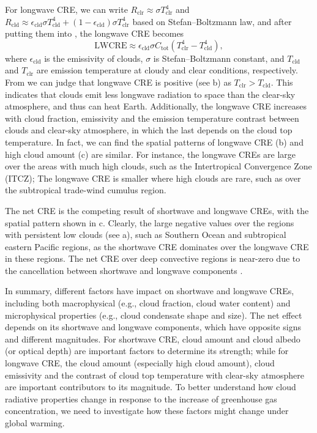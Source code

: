 For longwave CRE, we can write $R_{\mathrm{clr}}\approx \sigma T_{\mathrm{clr}}^4$ and $R_{\mathrm{cld}}\approx \epsilon_{\mathrm{cld}}\sigma T_{\mathrm{cld}}^4 +  (1-\epsilon_{\mathrm{cld}}) \sigma T_{\mathrm{clr}}^4$ based on Stefan--Boltzmann law, and after putting them into , the longwave CRE becomes
\begin{equation}
    \mathrm{LWCRE} \approx \epsilon_{\mathrm{cld}} \sigma C_{\mathrm{tot}}\left(T_{\mathrm{clr}}^4-T_{\mathrm{cld}}^4\right),
    \label{eq:lwcre2}
\end{equation}
where $\epsilon_{\mathrm{cld}}$ is the emissivity of clouds, $\sigma$ is Stefan--Boltzmann constant, and $T_{\mathrm{cld}}$ and $T_{\mathrm{clr}}$ are emission temperature at cloudy and clear conditions, respectively. From  we can judge that longwave CRE is positive  (see b) as $T_{\mathrm{clr}}>T_{\mathrm{cld}}$. This indicates that clouds emit less longwave radiation to space than the clear-sky atmosphere, and thus can heat Earth. Additionally, the longwave CRE increases with cloud fraction, emissivity and the emission temperature contrast between clouds and clear-sky atmosphere, in which the last depends on the cloud top temperature. In fact, we can find the spatial patterns of longwave CRE (b) and high cloud amount (c) are similar. For instance, the longwave CREs are large over the areas with much high clouds, such as the Intertropical Convergence Zone (ITCZ); The longwave CRE is smaller where high clouds are rare, such as over the subtropical trade-wind cumulus region.

The net CRE is the competing result of shortwave and longwave CREs, with the spatial pattern shown in c. Clearly, the large negative values over the regions with persistent low clouds (see a), such as Southern Ocean and subtropical eastern Pacific regions, as the shortwave CRE dominates over the longwave CRE in these regions. The net CRE over deep convective regions is near-zero due to the cancellation between shortwave and longwave components \citep[e.g.,][]{Wall2019net}.

In summary, different factors have impact on shortwave and longwave CREs, including both macrophysical (e.g., cloud fraction, cloud water content) and microphysical properties (e.g., cloud condensate shape and size). The net effect depends on its shortwave and longwave components, which have opposite signs and different magnitudes. For shortwave CRE, cloud amount and cloud albedo (or optical depth) are important factors to determine its strength; while for longwave CRE, the cloud amount (especially high cloud amount), cloud emissivity and the contrast of cloud top temperature with clear-sky atmosphere are important contributors to its magnitude. To better understand how cloud radiative properties change in response to the increase of greenhouse gas concentration, we need to investigate how these factors might change under global warming.

